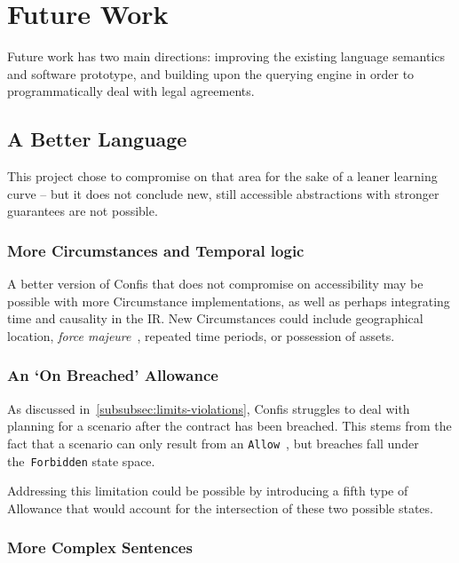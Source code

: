 \section{Future Work}\label{sec:future-work}

Future work has two main directions: improving the existing language semantics and software prototype, and building upon the querying engine in order to programmatically deal with legal agreements.

\subsection{A Better Language}\label{subsec:future:better-language-semantics}

This project chose to compromise on that area for the sake of a leaner learning curve -- but it does not conclude new, still accessible abstractions with stronger guarantees are not possible.

\subsubsection{More Circumstances and Temporal logic}\label{subsubsec:future:more-circumstances-and-temporal-logic}
A better version of Confis that does not compromise on accessibility may be possible with more Circumstance implementations, as well as perhaps integrating time and causality in the IR\@.
New Circumstances could include geographical location, \emph{force majeure}~\cite{forceMajeureDefinition}, repeated time periods, or possession of assets.

\subsubsection{An `On Breached' Allowance}

As discussed in~\autoref{subsubsec:limits-violations}, Confis struggles to deal with planning for a scenario after the contract has been breached.
This stems from the fact that a scenario can only result from an \texttt{Allow}~, but breaches fall under the~\texttt{Forbidden} state space.

Addressing this limitation could be possible by introducing a fifth type of Allowance that would account for the intersection of these two possible states.

\subsubsection{More Complex Sentences}

